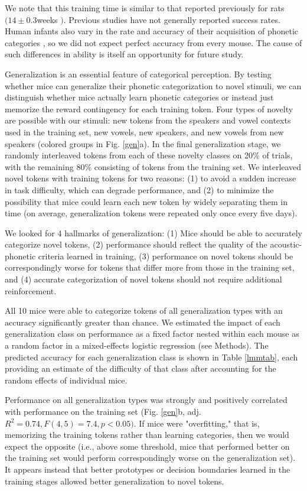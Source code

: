 \documentclass[11pt]{article}\usepackage[]{graphicx}\usepackage[]{color}
\begin{document}
We note that this training time is similar to that reported previously for rats $ (14\pm 0.3 $weeks \cite{Engineer2015}$) $. Previous studies have not generally reported success rates. Human infants also vary in the rate and accuracy of their acquisition of phonetic categories \cite{Werker1988}, so we did not expect perfect accuracy from every mouse. The cause of such differences in ability is itself an opportunity for future study.

Generalization is an essential feature of categorical perception. By testing whether mice can generalize their phonetic categorization to novel stimuli, we can distinguish whether mice actually learn phonetic categories or instead just memorize the reward contingency for each training token. Four types of novelty are possible with our stimuli: new tokens from the speakers and vowel contexts used in the training set, new vowels, new speakers, and new vowels from new speakers (colored groups in Fig. \ref{gen}a). In the final generalization stage, we randomly interleaved tokens from each of these novelty classes on 20\% of trials, with the remaining 80\% consisting of tokens from the training set. We interleaved novel tokens with training tokens for two reasons: (1) to avoid a sudden increase in task difficulty, which can degrade performance, and (2) to minimize the possibility that mice could learn each new token by widely separating them in time (on average, generalization tokens were repeated only once every five days).

We looked for 4 hallmarks of generalization: (1) Mice should be able to accurately categorize novel tokens, (2) performance should reflect the quality of the acoustic-phonetic criteria learned in training, (3) performance on novel tokens should be correspondingly worse for tokens that differ more from those in the training set, and (4) accurate categorization of novel tokens should not require additional reinforcement.

All 10 mice were able to categorize tokens of all generalization types with an accuracy significantly greater than chance. We estimated the impact of each generalization class on performance as a fixed factor nested within each mouse as a random factor in a mixed-effects logistic regression (see Methods). The predicted accuracy for each generalization class is shown in Table \ref{lmmtab}, each providing an estimate of the difficulty of that class after accounting for the random effects of individual mice.

Performance on all generalization types was strongly and positively correlated with performance on the training set (Fig. \ref{gen}b, adj. $R^2=0.74, F(4, 5) = 7.4, p < 0.05)$. If mice were "overfitting," that is, memorizing the training tokens rather than learning categories, then we would expect the opposite (i.e., above some threshold, mice that performed better on the training set would perform correspondingly worse on the generalization set). It appears instead that better prototypes or decision boundaries learned in the training stages allowed better generalization to novel tokens.
\end{document}
